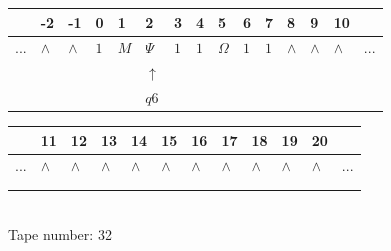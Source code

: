 \documentclass[11pt]{article}
\begin{document}
\begin{table}[H]
\centering
\begin{tabular}{lllllllllllllll}
 & -2 & -1 & 0 & 1 & 2 & 3 & 4 & 5 & 6 & 7 & 8 & 9 & 10 & \\
\hline
$...$ & \multicolumn{1}{|l|}{$\wedge$} & \multicolumn{1}{|l|}{$\wedge$} & \multicolumn{1}{|l|}{$1$} & \multicolumn{1}{|l|}{$M$} & \multicolumn{1}{|l|}{$\Psi$} & \multicolumn{1}{|l|}{$1$} & \multicolumn{1}{|l|}{$1$} & \multicolumn{1}{|l|}{$\Omega$} & \multicolumn{1}{|l|}{$1$} & \multicolumn{1}{|l|}{$1$} & \multicolumn{1}{|l|}{$\wedge$} & \multicolumn{1}{|l|}{$\wedge$} & \multicolumn{1}{|l|}{$\wedge$} & $...$\\
\hline
&  &  &  &  & $\uparrow$ &  &  &  &  &  &  &  &  &  \\
&  &  &  &  & $ q6 $ &  &  &  &  &  &  &  &  &  \\
\end{tabular}
\begin{tabular}{llllllllllll}
 & 11 & 12 & 13 & 14 & 15 & 16 & 17 & 18 & 19 & 20 & \\
\hline
$...$ & \multicolumn{1}{|l|}{$\wedge$} & \multicolumn{1}{|l|}{$\wedge$} & \multicolumn{1}{|l|}{$\wedge$} & \multicolumn{1}{|l|}{$\wedge$} & \multicolumn{1}{|l|}{$\wedge$} & \multicolumn{1}{|l|}{$\wedge$} & \multicolumn{1}{|l|}{$\wedge$} & \multicolumn{1}{|l|}{$\wedge$} & \multicolumn{1}{|l|}{$\wedge$} & \multicolumn{1}{|l|}{$\wedge$} & $...$\\
\hline
&  &  &  &  &  &  &  &  &  &  &  \\
&  &  &  &  &  &  &  &  &  &  &  \\
\end{tabular}
\\
Tape number: 32
\noindent\makebox[\linewidth]{\hdashrule{\textwidth}{1pt}{1pt}}\end{table}
\end{document}
